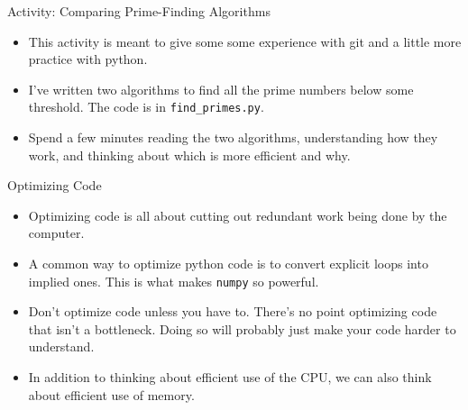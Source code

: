 \begin{frame}{Activity: Comparing Prime-Finding Algorithms}

 \begin{itemize}
   
  \item This activity is meant to give some some experience with git and a 
   little more practice with python.

  \item I've written two algorithms to find all the prime numbers below some 
  threshold.  The code is in \texttt{find\_primes.py}.

  \item Spend a few minutes reading the two algorithms, understanding how they 
   work, and thinking about which is more efficient and why.

 \end{itemize}

\end{frame}

\begin{frame}{Optimizing Code}

 \begin{itemize}

  \item Optimizing code is all about cutting out redundant work being done by 
   the computer.

  \item A common way to optimize python code is to convert explicit loops into 
   implied ones.  This is what makes \texttt{numpy} so powerful.

  \item Don't optimize code unless you have to.  There's no point optimizing 
   code that isn't a bottleneck.  Doing so will probably just make your code 
   harder to understand.

  \item In addition to thinking about efficient use of the CPU, we can also 
   think about efficient use of memory.

 \end{itemize}

\end{frame}


